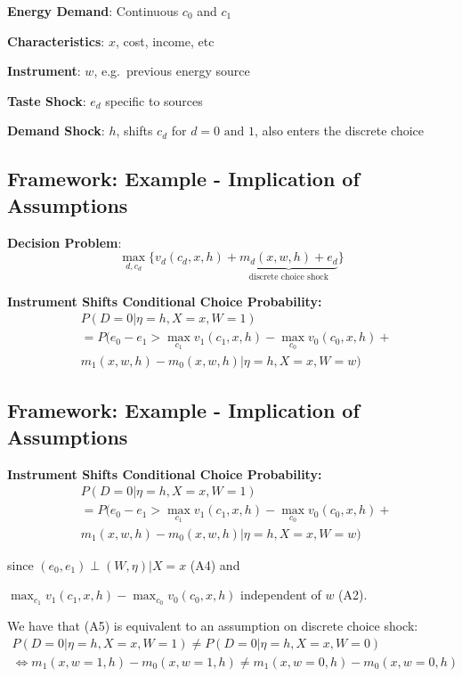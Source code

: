 \documentclass[
  letterpaper,
  DIV=11,
  numbers=noendperiod]{scrartcl}
\begin{document}
\textbf{Energy Demand}: Continuous \(c_0\) and \(c_1\)

\textbf{Characteristics}: \(x\), cost, income, etc

\textbf{Instrument}: \(w\), e.g.~previous energy source

\textbf{Taste Shock}: \(e_d\) specific to sources

\textbf{Demand Shock}: \(h\), shifts \(c_d\) for
\(d = 0 \text{ and } 1\), also enters the discrete choice

\subsection{Framework: Example - Implication of
Assumptions}\label{framework-example---implication-of-assumptions}

\textbf{Decision Problem}:
\[\max_{d, c_d} \{v_d(c_d,x,h) + \underbrace{m_d(x,w,h) + e_d}_{\text{discrete choice shock}}\}\]

\textbf{Instrument Shifts Conditional Choice Probability:} \[
\begin{align}
 &P(D = 0 | \eta = h, X = x, W = 1) \\
 &= P(e_0 - e_1 > \max_{c_1}v_1(c_1,x,h) - \max_{c_0}v_0(c_0,x,h)+ \\
 & m_1(x,w,h)-m_0(x,w,h)| \eta = h, X = x, W = w)
\end{align}
\]

\subsection{Framework: Example - Implication of
Assumptions}\label{framework-example---implication-of-assumptions-1}

\textbf{Instrument Shifts Conditional Choice Probability:} \[
\begin{align}
 &P(D = 0 | \eta = h, X = x, W = 1) \\
 &= P(e_0 - e_1 > \max_{c_1}v_1(c_1,x,h) - \max_{c_0}v_0(c_0,x,h)+ \\
 & m_1(x,w,h)-m_0(x,w,h)| \eta = h, X = x, W = w)
\end{align}
\]

since \((e_0,e_1) \perp (W,\eta) | X = x\) (A4) and

\(\max_{c_1}v_1(c_1,x,h) - \max_{c_0}v_0(c_0,x,h)\) independent of \(w\)
(A2).

We have that (A5) is equivalent to an assumption on discrete choice
shock: \[
\begin{align}
 P(D = 0 | \eta = h, X = x, W = 1) \neq P(D = 0 | \eta = h, X = x, W = 0) \\
 \iff m_1(x,w=1,h)-m_0(x,w=1,h) \neq m_1(x,w=0,h)-m_0(x,w=0,h)
\end{align}
\]
\end{document}
